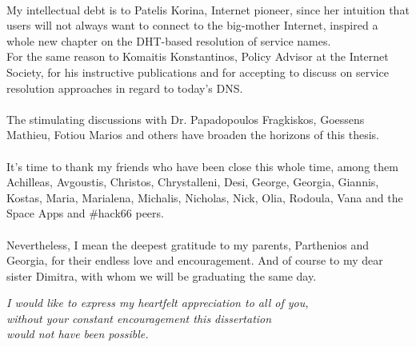 \paragraph{}
My intellectual debt is to Patelis Korina, Internet pioneer, since her intuition that users will not always want to connect to the big-mother Internet, inspired a whole new chapter on the DHT-based resolution of service names.\\
\indent For the same reason to Komaitis Konstantinos, Policy Advisor at the Internet Society, for his instructive publications and for accepting to discuss on service resolution approaches in regard to today's DNS.

\paragraph{}
The stimulating discussions with Dr. Papadopoulos Fragkiskos, Goessens Mathieu, Fotiou Marios and others have broaden the horizons of this thesis.

\paragraph{}
It's time to thank my friends who have been close this whole time, among them Achilleas, Avgoustis, Christos, Chrystalleni, Desi, George, Georgia, Giannis, Kostas, Maria, Marialena, Michalis, Nicholas, Nick, Olia, Rodoula, Vana and the Space Apps and \#hack66 peers.

\paragraph{}
Nevertheless, I mean the deepest gratitude to my parents, Parthenios and Georgia, for their endless love and encouragement. And of course to my dear sister Dimitra, with whom we will be graduating the same day.\\[0.8cm]


\begin{flushright}
\emph{I would like to express my heartfelt appreciation to all of you,\\
without your constant encouragement this dissertation\\
would not have been possible.}
\end{flushright}